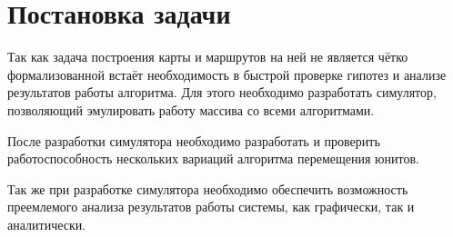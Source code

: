 \newpage
\section{Постановка задачи}

Так как задача построения карты и маршрутов на ней
не является чётко формализованной встаёт необходимость
в быстрой проверке гипотез и анализе результатов 
работы алгоритма. Для этого необходимо разработать симулятор,
позволяющий эмулировать работу массива со всеми алгоритмами.

После разработки симулятора необходимо разработать и проверить 
работоспособность нескольких вариаций алгоритма перемещения юнитов.

Так же при разработке симулятора необходимо обеспечить
возможность преемлемого анализа результатов работы
системы, как графически, так и аналитически.
